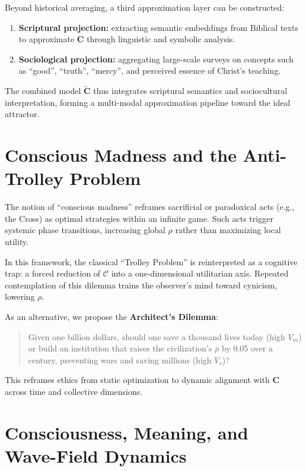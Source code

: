 \documentclass[11pt,a4paper]{article}
\theoremstyle{definition}
\theoremstyle{remark}
\begin{document}
\begin{small}
Beyond historical averaging, a third approximation layer can be constructed:
\begin{enumerate}
    \item \textbf{Scriptural projection:} extracting semantic embeddings from Biblical texts to approximate $\mathbf{C}$ through linguistic and symbolic analysis.
    \item \textbf{Sociological projection:} aggregating large-scale surveys on concepts such as ``good'', ``truth'', ``mercy'', and perceived essence of Christ's teaching.
\end{enumerate}

The combined model $\tilde{\mathbf{C}}$ thus integrates scriptural semantics and sociocultural interpretation, forming a multi-modal approximation pipeline toward the ideal attractor.


\section{Conscious Madness and the Anti-Trolley Problem}

The notion of ``conscious madness'' reframes sacrificial or paradoxical acts (e.g., the Cross) as optimal strategies within an infinite game. Such acts trigger systemic phase transitions, increasing global $\rho$ rather than maximizing local utility.

In this framework, the classical ``Trolley Problem'' is reinterpreted as a cognitive trap: a forced reduction of $\mathcal{C}$ into a one-dimensional utilitarian axis. Repeated contemplation of this dilemma trains the observer's mind toward cynicism, lowering $\rho$.

As an alternative, we propose the \textbf{Architect’s Dilemma}:
\begin{quote}
Given one billion dollars, should one save a thousand lives today (high $V_m$) or build an institution that raises the civilization’s $\bar{\rho}$ by 0.05 over a century, preventing wars and saving millions (high $V_s$)?
\end{quote}

This reframes ethics from static optimization to dynamic alignment with $\mathbf{C}$ across time and collective dimensions.



\section{Consciousness, Meaning, and Wave-Field Dynamics}


\end{small}
\end{document}
